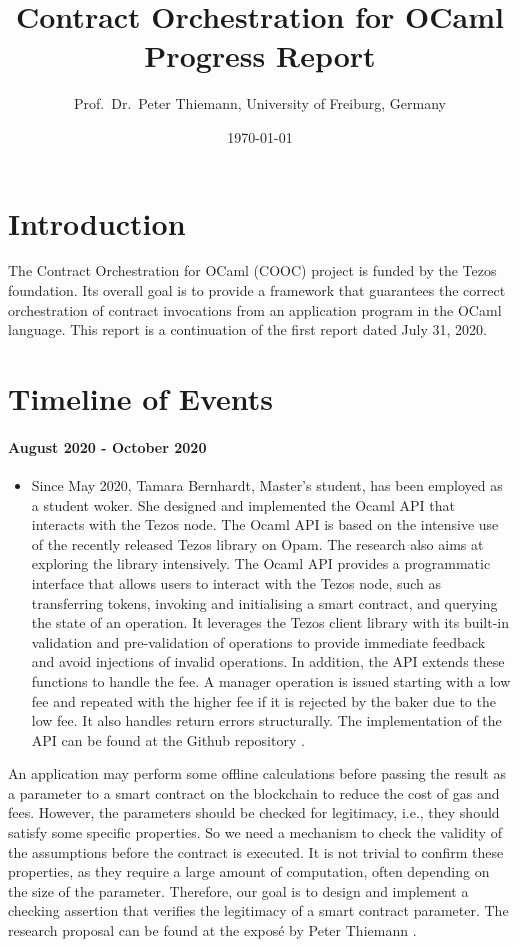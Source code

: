 \documentclass[a4paper,11pt]{article}
\title{Contract Orchestration for OCaml \\
  Progress Report 
}
\date{\today}
\author{Prof.\ Dr.\ Peter Thiemann, University of Freiburg, Germany}
\begin{document}
\maketitle{}

\section{Introduction}
\label{sec:introduction}

The Contract Orchestration for OCaml (COOC) project is funded by the Tezos foundation. Its overall goal  is to provide a framework that guarantees the correct orchestration of contract invocations from an application program in the OCaml language. This report is a continuation of the first report dated July 31, 2020.

\section{Timeline of Events}
\label{sec:timeline-events}

\paragraph{August 2020 - October 2020} 
\begin{itemize}
\item
Since May 2020, Tamara Bernhardt, Master's student, has been employed as a student woker. She designed and implemented the Ocaml API that interacts with the Tezos node. The Ocaml API is based on the intensive use of the recently released Tezos library on Opam. The research  also aims at exploring the library intensively. The Ocaml API provides a programmatic interface that allows users to interact with the Tezos node, such as transferring tokens, invoking and initialising a smart contract, and querying the state of an operation. It leverages the Tezos client library with its built-in validation and pre-validation of operations to provide immediate feedback and avoid injections of invalid operations. In addition, the API extends these functions to handle the fee. A manager operation is issued starting with a low fee and repeated with the higher fee if it is rejected by the baker due to the low fee. It also handles return errors structurally. The implementation of the API can be found at the Github repository \cite{tezos-api}.

\end{itemize}
An application may perform some offline calculations before passing the result as a parameter to a smart contract on the blockchain to reduce the cost of gas and fees. However, the parameters should be checked for legitimacy, i.e., they should satisfy some specific properties. So we need a mechanism to check the validity of the assumptions before the contract is executed. It is not trivial to confirm these properties, as they  require a large amount of computation, often depending on the size of the parameter. Therefore, our goal is to design and implement a checking assertion that verifies the legitimacy of a smart contract parameter. The research proposal can be found at the expos\'{e} by Peter Thiemann \cite{expose}.
\end{document}
